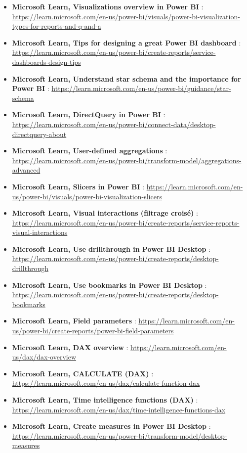 {\small\makeatletter{}
\begin{itemize}
	\item \textbf{Microsoft Learn, Visualizations overview in Power BI} : \url{https://learn.microsoft.com/en-us/power-bi/visuals/power-bi-visualization-types-for-reports-and-q-and-a}
	\item \textbf{Microsoft Learn, Tips for designing a great Power BI dashboard} : \url{https://learn.microsoft.com/en-us/power-bi/create-reports/service-dashboards-design-tips}
	\item \textbf{Microsoft Learn, Understand star schema and the importance for Power BI} : \url{https://learn.microsoft.com/en-us/power-bi/guidance/star-schema}
	\item \textbf{Microsoft Learn, DirectQuery in Power BI} : \url{https://learn.microsoft.com/en-us/power-bi/connect-data/desktop-directquery-about}
	\item \textbf{Microsoft Learn, User-defined aggregations} : \url{https://learn.microsoft.com/en-us/power-bi/transform-model/aggregations-advanced}
	\item \textbf{Microsoft Learn, Slicers in Power BI} : \url{https://learn.microsoft.com/en-us/power-bi/visuals/power-bi-visualization-slicers}
	\item \textbf{Microsoft Learn, Visual interactions (filtrage croisé)} : \url{https://learn.microsoft.com/en-us/power-bi/create-reports/service-reports-visual-interactions}
	\item \textbf{Microsoft Learn, Use drillthrough in Power BI Desktop} : \url{https://learn.microsoft.com/en-us/power-bi/create-reports/desktop-drillthrough}
	\item \textbf{Microsoft Learn, Use bookmarks in Power BI Desktop} : \url{https://learn.microsoft.com/en-us/power-bi/create-reports/desktop-bookmarks}
	\item \textbf{Microsoft Learn, Field parameters} : \url{https://learn.microsoft.com/en-us/power-bi/create-reports/power-bi-field-parameters}
	\item \textbf{Microsoft Learn, DAX overview} : \url{https://learn.microsoft.com/en-us/dax/dax-overview}
	\item \textbf{Microsoft Learn, CALCULATE (DAX)} : \url{https://learn.microsoft.com/en-us/dax/calculate-function-dax}
	\item \textbf{Microsoft Learn, Time intelligence functions (DAX)} : \url{https://learn.microsoft.com/en-us/dax/time-intelligence-functions-dax}
	\item \textbf{Microsoft Learn, Create measures in Power BI Desktop} : \url{https://learn.microsoft.com/en-us/power-bi/transform-model/desktop-measures}

\end{itemize}}
